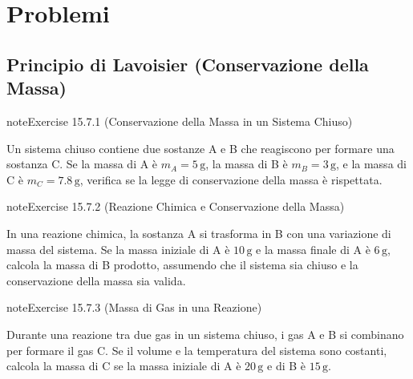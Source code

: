 \documentclass[letterpaper,10pt,italian]{jupyterBook}
\begin{document}
\sphinxstepscope


\section{Problemi}
\label{\detokenize{ch/thermodynamics/principles-problems:problemi}}\label{\detokenize{ch/thermodynamics/principles-problems:physics-hs-thermodynamics-principles-problems}}\label{\detokenize{ch/thermodynamics/principles-problems::doc}}

\subsection{Principio di Lavoisier (Conservazione della Massa)}
\label{\detokenize{ch/thermodynamics/principles-problems:principio-di-lavoisier-conservazione-della-massa}} \label{exercise:ch/thermodynamics/principles-problems-exercise-0}

\begin{sphinxadmonition}{note}{Exercise 15.7.1 (Conservazione della Massa in un Sistema Chiuso)}



\sphinxAtStartPar
Un sistema chiuso contiene due sostanze A e B che reagiscono per formare una sostanza C. Se la massa di A è \(m_A = 5 \, \text{g}\), la massa di B è \(m_B = 3 \, \text{g}\), e la massa di C è \(m_C = 7.8 \, \text{g}\), verifica se la legge di conservazione della massa è rispettata.
\end{sphinxadmonition}
 \label{exercise:ch/thermodynamics/principles-problems-exercise-1}

\begin{sphinxadmonition}{note}{Exercise 15.7.2 (Reazione Chimica e Conservazione della Massa)}



\sphinxAtStartPar
In una reazione chimica, la sostanza A si trasforma in B con una variazione di massa del sistema. Se la massa iniziale di A è \(10 \, \text{g}\) e la massa finale di A è \(6 \, \text{g}\), calcola la massa di B prodotto, assumendo che il sistema sia chiuso e la conservazione della massa sia valida.
\end{sphinxadmonition}
 \label{exercise:ch/thermodynamics/principles-problems-exercise-2}

\begin{sphinxadmonition}{note}{Exercise 15.7.3 (Massa di Gas in una Reazione)}



\sphinxAtStartPar
Durante una reazione tra due gas in un sistema chiuso, i gas A e B si combinano per formare il gas C. Se il volume e la temperatura del sistema sono costanti, calcola la massa di C se la massa iniziale di A è \(20 \, \text{g}\) e di B è \(15 \, \text{g}\).
\end{sphinxadmonition}
 \label{exercise:ch/thermodynamics/principles-problems-exercise-3}
\end{document}
